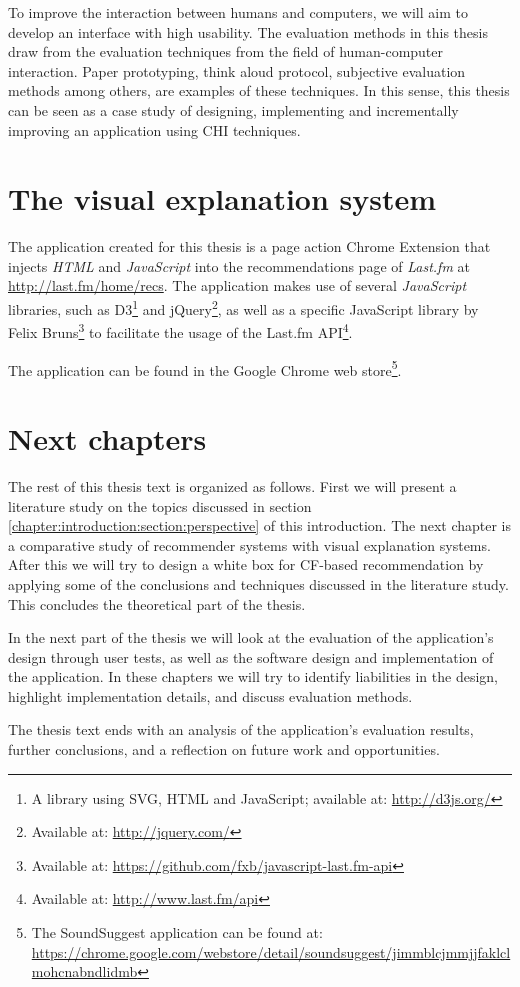 To improve the interaction between humans and computers, we will aim to develop an interface with high usability. The evaluation methods in this thesis draw from the evaluation techniques from the field of human-computer interaction. Paper prototyping, think aloud protocol, subjective evaluation methods among others, are examples of these techniques\cite{nielsen:1993:UE:529793}. In this sense, this thesis can be seen as a case study of designing, implementing and incrementally improving an application using CHI techniques.


\section{The visual explanation system}\label{chapter:introduction:section:application}

The application created for this thesis is a page action Chrome Extension that injects \emph{HTML} and \emph{JavaScript} into the recommendations page of \emph{Last.fm} at \url{http://last.fm/home/recs}. The application makes use of several \emph{JavaScript} libraries, such as D3\footnote{A library using SVG, HTML and JavaScript\cite{bostock:2012:d3js}; available at: \url{http://d3js.org/}} and jQuery\footnote{Available at: \url{http://jquery.com/}}, as well as a specific JavaScript library by Felix Bruns\footnote{Available at: \url{https://github.com/fxb/javascript-last.fm-api}} to facilitate the usage of the Last.fm API\footnote{Available at: \url{http://www.last.fm/api}}.

The application can be found in the Google Chrome web store\footnote{The SoundSuggest application can be found at: \url{https://chrome.google.com/webstore/detail/soundsuggest/jimmblcjmmjjfaklclmohcnabndlidmb}}.


\section{Next chapters}\label{chapter:introduction:section:chapters}

The rest of this thesis text is organized as follows. First we will present a literature study on the topics discussed in section \ref{chapter:introduction:section:perspective} of this introduction. The next chapter is a comparative study of recommender systems with visual explanation systems. After this we will try to design a white box for CF-based recommendation by applying some of the conclusions and techniques discussed in the literature study. This concludes the theoretical part of the thesis.

In the next part of the thesis we will look at the evaluation of the application's design through user tests, as well as the software design and implementation of the application. In these chapters we will try to identify liabilities in the design, highlight implementation details, and discuss evaluation methods.

The thesis text ends with an analysis of the application's evaluation results, further conclusions, and a reflection on future work and opportunities.
